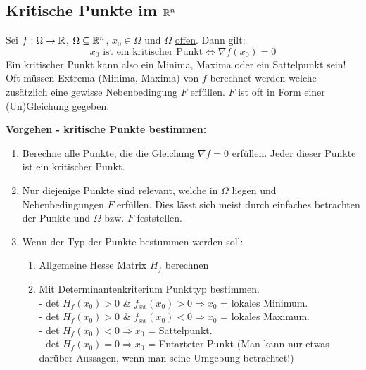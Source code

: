 \subsection{Kritische Punkte im $\mathbb{R}^n$}
Sei $f: \Omega \to \mathbb{R}$, $\Omega \subseteq \mathbb{R}^n$,  $x_0 \in \Omega$ und $\Omega$ \uline{offen}. Dann gilt: 
\[
	x_0 \text{ ist ein kritischer Punkt} \Leftrightarrow \nabla f(x_0) = 0
\]
Ein kritischer Punkt kann also ein Minima, Maxima oder ein Sattelpunkt sein! Oft müssen Extrema (Minima, Maxima) von $f$ berechnet werden welche zusätzlich eine gewisse Nebenbedingung $F$ erfüllen. $F$ ist oft in Form einer (Un)Gleichung 
gegeben. 

\textbf{Vorgehen - kritische Punkte bestimmen:} 
\begin{enumerate}[leftmargin=0.5cm]
	\item Berechne alle Punkte, die die Gleichung $\nabla f = 0$ erfüllen. Jeder dieser Punkte ist ein kritischer Punkt.

	\item Nur diejenige Punkte sind relevant, welche in $\Omega$ liegen und Nebenbedingungen $F$ erfüllen. Dies lässt sich meist durch einfaches betrachten der Punkte und $\Omega$ bzw. $F$ feststellen.

	\item Wenn der Typ der Punkte bestummen werden soll:
	\begin{enumerate}[leftmargin=0.3cm]
		\item Allgemeine Hesse Matrix $H_f$ berechnen

		\item Mit Determinantenkriterium Punkttyp bestimmen.\\
		- det $H_f(x_0) > 0$ \& $f_{xx}(x_0) > 0 \Rightarrow x_0$ = lokales Minimum.\\
		- det $H_f(x_0) > 0$ \& $f_{xx}(x_0) < 0 \Rightarrow x_0$ = lokales Maximum.\\
		- det $H_f(x_0) < 0 \Rightarrow x_0$ = Sattelpunkt.\\
		- det $H_f(x_0) = 0 \Rightarrow x_0$ = Entarteter Punkt (Man kann nur etwas darüber Aussagen, wenn man seine Umgebung betrachtet!)
	\end{enumerate}
\end{enumerate}

